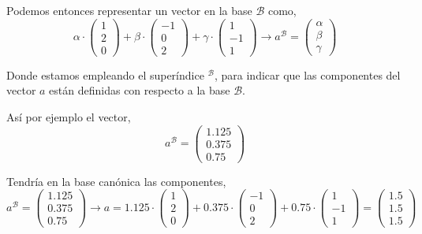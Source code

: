 Podemos entonces representar un vector en la base $\mathcal{B}$ como,
\begin{equation*}
\alpha \cdot \begin{pmatrix}
1\\
2\\
0
\end{pmatrix}+\beta \cdot \begin{pmatrix}
-1\\
0\\
2
\end{pmatrix}+ \gamma \cdot \begin{pmatrix}
1\\
-1\\
1
\end{pmatrix} \rightarrow a^{\mathcal{B}}=\begin{pmatrix}
\alpha \\
\beta \\
\gamma
\end{pmatrix}
\end{equation*} 
 
Donde  estamos empleando el superíndice $^{\mathcal{B}}$, para indicar que las componentes del vector $a$ están definidas con respecto a la base $\mathcal{B}$.

Así por ejemplo el vector,
\begin{equation*}
a^{\mathcal{B}}=\begin{pmatrix}
1.125\\
0.375\\
0.75
\end{pmatrix}
\end{equation*}

Tendría en la base canónica las componentes, 
\begin{equation*}
a^{\mathcal{B}}=\begin{pmatrix}
1.125\\
0.375\\
0.75
\end{pmatrix} \rightarrow a= 1.125 \cdot \begin{pmatrix}
1\\
2\\
0
\end{pmatrix}+0.375 \cdot \begin{pmatrix}
-1\\
0\\
2
\end{pmatrix}+ 0.75 \cdot \begin{pmatrix}
1\\
-1\\
1
\end{pmatrix} =\begin{pmatrix}
1.5\\
1.5 \\
1.5
\end{pmatrix}
\end{equation*}

